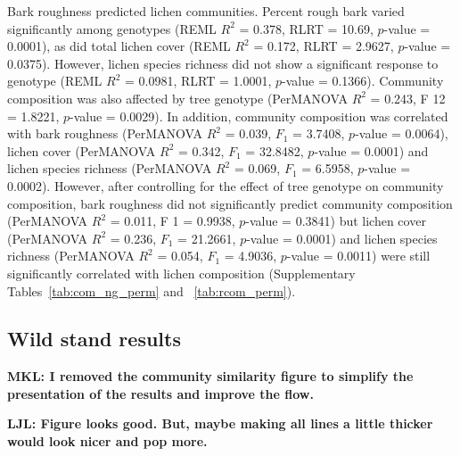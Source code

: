 \documentclass[9pt,twocolumn,twoside,lineno]{pnas-new}
\begin{document}
{Bark roughness predicted lichen communities. Percent rough bark varied
significantly among genotypes (REML $R^2$ = 0.378, RLRT = 10.69,
$p$-value = 0.0001), as did total lichen cover (REML $R^2$ = 0.172,
RLRT = 2.9627, $p$-value = 0.0375). However, lichen species richness
did not show a significant response to genotype (REML $R^2$ = 0.0981,
RLRT = 1.0001, $p$-value = 0.1366). Community composition was also
affected by tree genotype (PerMANOVA $R^2$ = 0.243, F 12 = 1.8221,
$p$-value = 0.0029). In addition, community composition was correlated
with bark roughness (PerMANOVA $R^2$ = 0.039, $F_1$ = 3.7408,
$p$-value = 0.0064), lichen cover (PerMANOVA $R^2$ = 0.342, $F_1$ =
32.8482, $p$-value = 0.0001) and lichen species richness (PerMANOVA
$R^2$ = 0.069, $F_1$ = 6.5958, $p$-value = 0.0002). However, after
controlling for the effect of tree genotype on community composition,
bark roughness did not significantly predict community composition
(PerMANOVA $R^2$ = 0.011, F 1 = 0.9938, $p$-value = 0.3841) but lichen
cover (PerMANOVA $R^2$ = 0.236, $F_1$ = 21.2661, $p$-value = 0.0001)
and lichen species richness (PerMANOVA $R^2$ = 0.054, $F_1$ = 4.9036,
$p$-value = 0.0011) were still significantly correlated with lichen
composition (Supplementary Tables~\ref{tab:com_ng_perm} and
~\ref{tab:rcom_perm}).


\subsection{Wild stand results}

\textbf{MKL: I removed the community similarity figure to simplify the
presentation of the results and improve the flow.}


\textbf{LJL: Figure looks good. But, maybe making all lines a little
  thicker would look nicer and pop more.}

}
\end{document}
